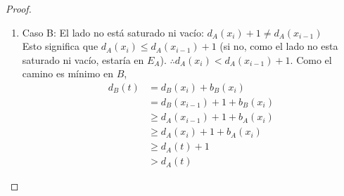 \begin{proof}
\begin{enumerate}
\begin{enumerate}
    \item Caso B: El lado no está saturado ni vacío: $d_A(x_i) + 1 \neq d_A(x_{i-1})$\\
    Esto significa que $d_A(x_{i}) \le d_A(x_{i-1}) + 1$ (si no, como el lado no esta saturado ni vacío, estaría en $E_A$).
    $\therefore d_A(x_i) < d_A(x_{i-1}) + 1$. Como el camino es mínimo en $B$,
    \begin{align}
        d_B(t)
        &= d_B(x_i) + b_B(x_i)\\
        &= d_B(x_{i-1}) + 1 + b_B(x_i)\\
        &\ge d_A(x_{i-1}) + 1 + b_A(x_i)\\
        &\ge d_A(x_i) + 1 + b_A(x_i)\\
        &\ge d_A(t) + 1\\
        &> d_A(t)
    \end{align}
    \end{enumerate}
\end{enumerate}
\end{proof}

